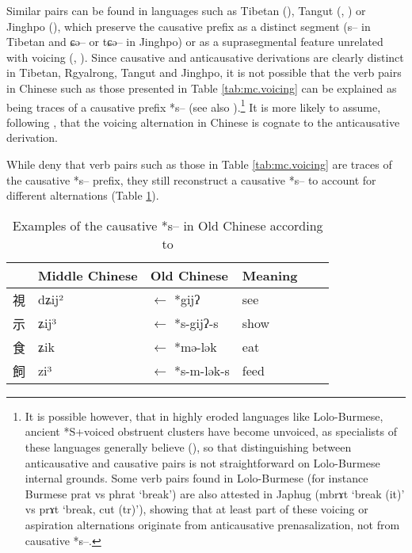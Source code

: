 \documentclass[oldfontcommands,oneside,a4paper,11pt]{article}
\newcommand{\ipa}[1]{{\phon \mbox{#1}}} %
\newcommand{\zh}[1]{{\cn #1}}
\begin{document}
Similar pairs can be found in languages such as Tibetan (\citealt{jacques12internal, hill14voicing}), Tangut (\citealt{gong88alternations}, \citealt[245-8]{jacques14esquisse}) or Jinghpo (\citealt[78]{dai90yufa}), which preserve the causative prefix as a distinct segment (\ipa{s--} in Tibetan and \ipa{ɕə--} or \ipa{tɕə--} in Jinghpo) or as a suprasegmental feature unrelated with voicing (\citealt{gong99jinyuanyin}, \citealt[250-1]{jacques14esquisse}). Since causative and anticausative derivations are clearly distinct in Tibetan, Rgyalrong, Tangut and Jinghpo, it is not possible that the verb pairs in Chinese such as those presented in Table \ref{tab:mc.voicing} can be explained as being traces of a causative prefix *\ipa{s--} (see also \citealt{lapolla03}).\footnote{It is possible however, that in highly eroded languages like Lolo-Burmese, ancient *S+voiced obstruent clusters have become unvoiced, as specialists of these languages generally believe (\citealt{bradley79, gerner07caus}), so that distinguishing between anticausative and causative pairs is not straightforward on Lolo-Burmese internal grounds. Some verb pairs found in Lolo-Burmese (for instance Burmese \ipa{prat} vs \ipa{phrat} `break') are also attested in Japhug (\ipa{mbrɤt} `break (it)' vs \ipa{prɤt} `break, cut (tr)'), showing that at least part of these voicing or aspiration alternations originate from anticausative prenasalization, not from causative *\ipa{s--}.  } It is more likely to assume, following  \citet{sagart12sprefix}, that the voicing alternation in Chinese is cognate to the anticausative derivation.

While \citet{sagart12sprefix} deny that verb pairs such as those in Table \ref{tab:mc.voicing} are traces of the causative *\ipa{s--} prefix, they still reconstruct a causative *\ipa{s--} to account for different alternations (Table \ref{tab:caus.oc}).

   \begin{table}[h]
\caption{Examples of the causative *\ipa{s--} in Old Chinese according to \citet{sagart12sprefix}}\label{tab:caus.oc} \centering
\begin{tabular}{llllll}
\toprule
  &Middle Chinese  &Old Chinese &Meaning \\
  \midrule
  \zh{視}& \ipa{dʑij²} &$\leftarrow$ *\ipa{gijʔ}  & see \\
\zh{示}& \ipa{ʑij³} &$\leftarrow$ *\ipa{s-gijʔ-s}  & show \\
\zh{食}& \ipa{ʑik} &$\leftarrow$ *\ipa{mə-lək}  & eat \\
\zh{飼}& \ipa{zi³} &$\leftarrow$ *\ipa{s-m-lək-s}  & feed \\
\bottomrule
\end{tabular}
\end{table}
\end{document}
